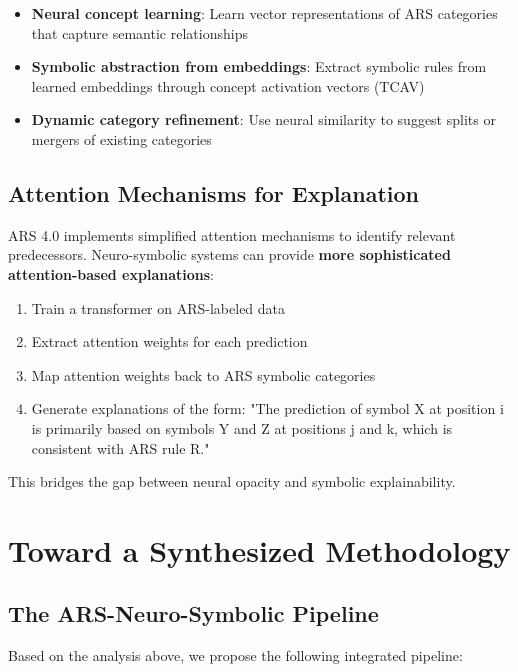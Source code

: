 \documentclass[12pt,a4paper]{article}
\begin{document}
\begin{itemize}
    \item \textbf{Neural concept learning}: Learn vector representations of 
    ARS categories that capture semantic relationships
    \item \textbf{Symbolic abstraction from embeddings}: Extract symbolic 
    rules from learned embeddings through concept activation vectors (TCAV)
    \item \textbf{Dynamic category refinement}: Use neural similarity to suggest 
    splits or mergers of existing categories
\end{itemize}

\subsection{Attention Mechanisms for Explanation}

ARS 4.0 implements simplified attention mechanisms to identify relevant 
predecessors. Neuro-symbolic systems can provide \textbf{more sophisticated 
attention-based explanations}:

\begin{enumerate}
    \item Train a transformer on ARS-labeled data
    \item Extract attention weights for each prediction
    \item Map attention weights back to ARS symbolic categories
    \item Generate explanations of the form: "The prediction of symbol X at 
    position i is primarily based on symbols Y and Z at positions j and k, 
    which is consistent with ARS rule R."
\end{enumerate}

This bridges the gap between neural opacity and symbolic explainability.

\section{Toward a Synthesized Methodology}

\subsection{The ARS-Neuro-Symbolic Pipeline}

Based on the analysis above, we propose the following integrated pipeline:
\end{document}
